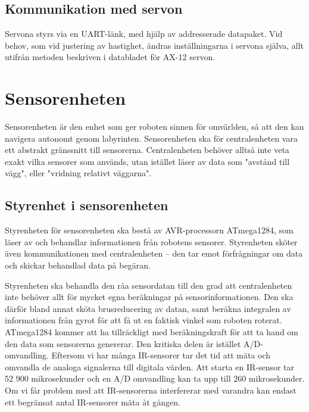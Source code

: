 \documentclass[a4paper,titlepage,12pt]{article}
\begin{document}
	\subsection{Kommunikation med servon}
	Servona styrs via en UART-länk, med hjälp av addresserade datapaket. Vid behov, 
	som vid justering av hastighet, ändras inställningarna i servona själva, allt 
	utifrån metoden beskriven i databladet för AX-12 servon.
	
    

	\section{Sensorenheten}
	
	Sensorenheten är den enhet som ger roboten sinnen för omvärlden, så att den
	kan navigera autonomt genom labyrinten. Sensorenheten ska för
	centralenheten vara ett abstrakt gränssnitt till sensorerna. Centralenheten
	behöver alltså inte veta exakt vilka sensorer som används, utan istället
	läser av data som "avstånd till vägg", eller "vridning relativt väggarna".

	\subsection{Styrenhet i sensorenheten}

	Styrenheten för sensorenheten ska bestå av AVR-processorn ATmega1284, som läser av och 
	behandlar informationen från robotens sensorer. Styrenheten sköter även
	kommunikationen med centralenheten -- den tar emot förfrågningar om data och
	skickar behandlad data på begäran.

	Styrenheten ska behandla den råa sensordatan till den grad att
	centralenheten inte behöver allt för mycket egna beräkningar på
	sensorinformationen. Den ska därför bland annat sköta brusreducering av
	datan, samt beräkna integralen av informationen från gyrot för att få ut en
	faktisk vinkel som roboten roterat. ATmega1284 kommer att ha tillräckligt med 
	beräkningskraft för att ta hand om den data som sensorerna genererar. Den kritiska 
	delen är istället A/D-omvandling. Eftersom vi har många IR-sensorer tar det tid att 
	mäta och omvandla de analoga signalerna till digitala värden. Att starta en IR-sensor 
	tar 52 900 mikrosekunder och en A/D omvandling kan ta upp till 260 mikrosekunder. 
	Om vi får problem med att IR-sensorerna interfererar med varandra kan endast ett 
	begränsat antal IR-sensorer mäta åt gången. 
\end{document}

